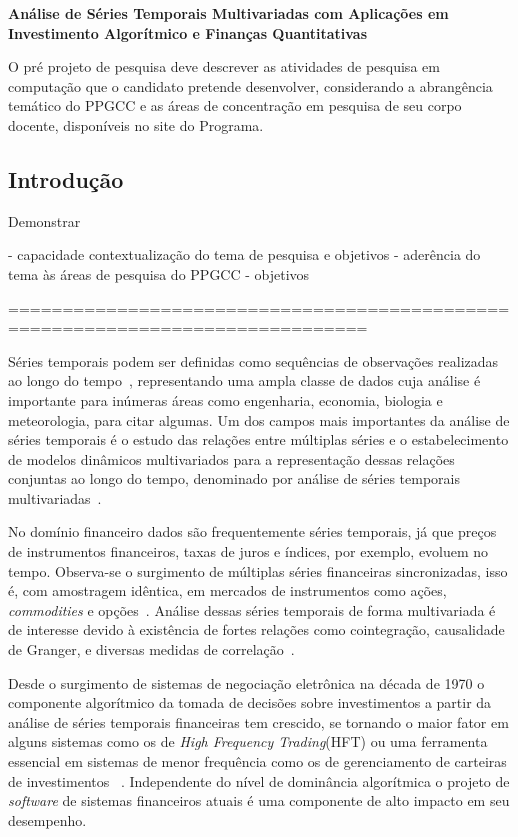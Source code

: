 \documentclass{article}
\begin{document}
\textbf{\large Análise de Séries Temporais Multivariadas com Aplicações em
Investimento Algorítmico e Finanças Quantitativas}

O pré projeto de pesquisa deve descrever as atividades de pesquisa em computação
que o candidato pretende desenvolver, considerando a abrangência temático do
PPGCC e as áreas de concentração em pesquisa de seu corpo docente, disponíveis
no site do Programa.

\subsection*{Introdução}

Demonstrar

- capacidade contextualização do tema de pesquisa e objetivos
- aderência do tema às áreas de pesquisa do PPGCC
- objetivos

===============================================================================

Séries temporais podem ser definidas como sequências de observações realizadas
ao longo do tempo~\cite{chatfield}, representando uma ampla classe de dados
cuja análise é importante para inúmeras áreas como engenharia, economia,
biologia e meteorologia, para citar algumas. Um dos campos mais importantes da
análise de séries temporais é o estudo das relações entre múltiplas séries e o
estabelecimento de modelos dinâmicos multivariados para a representação dessas
relações conjuntas ao longo do tempo, denominado por análise de séries
temporais multivariadas~\cite{box}.

No domínio financeiro dados são frequentemente séries temporais, já que preços
de instrumentos financeiros, taxas de juros e índices, por exemplo, evoluem no
tempo. Observa-se o surgimento de múltiplas séries financeiras sincronizadas,
isso é, com amostragem idêntica, em mercados de instrumentos como ações,
\emph{commodities} e opções~\cite{someeconshit}. Análise dessas séries
temporais de forma multivariada é de interesse devido à existência de fortes
relações como cointegração, causalidade de Granger, e diversas medidas de
correlação~\cite{Morettin}.

Desde o surgimento de sistemas de negociação eletrônica na década de 1970 o
componente algorítmico da tomada de decisões sobre investimentos a partir da
análise de séries temporais financeiras tem crescido, se tornando o maior fator
em alguns sistemas como os de \emph{High Frequency Trading}(HFT) ou uma
ferramenta essencial em sistemas de menor frequência como os de gerenciamento
de carteiras de investimentos ~\cite{algotrading}. Independente do nível de
dominância algorítmica o projeto de \emph{software} de sistemas financeiros
atuais é uma componente de alto impacto em seu desempenho.
\end{document}
